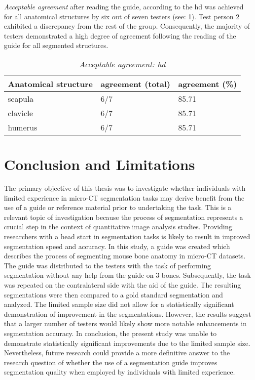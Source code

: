 \noindent
\textit{Acceptable agreement} after reading the guide, according to the \acrshort{hd} was achieved for all anatomical 
structures by six out of seven testers (see: \cref{tab:hd-acceptable}).
Test person 2 exhibited a discrepancy from the rest of the group.
Consequently, the majority of testers demonstrated a high degree of agreement following the reading of the guide for all segmented structures.
\begin{table}[ht]
	\begin{center}
		\begin{tabular}{l l l}
			\textbf{Anatomical structure} & agreement (total) & agreement (\%) \\
			\hline
			scapula                       & 6/7               & 85.71          \\
			clavicle                      & 6/7               & 85.71          \\
			humerus                       & 6/7               & 85.71          \\
		\end{tabular}
		\caption{\textit{Acceptable agreement: \acrshort{hd}}}\label{tab:hd-acceptable}
	\end{center}
\end{table}


\chapter{Conclusion and Limitations}\label{c:conclusion}
The primary objective of this thesis was to investigate whether individuals with limited experience in micro-CT segmentation tasks may derive benefit from 
the use of a guide or reference material prior to undertaking the task.
This is a relevant topic of investigation because the process of segmentation represents a crucial step in the context of quantitative image analysis studies.
Providing researchers with a head start in segmentation tasks is likely to result in improved segmentation speed and accuracy.
In this study, a guide was created which describes the process of segmenting mouse bone anatomy in micro-CT datasets.
The guide was distributed to the testers with the task of performing segmentation without any help from the guide on 3 bones.
Subsequently, the task was repeated on the contralateral side with the aid of the guide.
The resulting segmentations were then compared to a gold standard segmentation and analyzed.
The limited sample size did not allow for a statistically significant demonstration of improvement in the segmentations. 
However, the results suggest that a larger number of testers would likely show more notable enhancements in segmentation accuracy.
In conclusion, the present study was unable to demonstrate statistically significant improvements due to the limited sample size. 
Nevertheless, future research could provide a more definitive answer to the research question of whether the use of a 
segmentation guide improves segmentation quality when employed by individuals with limited experience.


